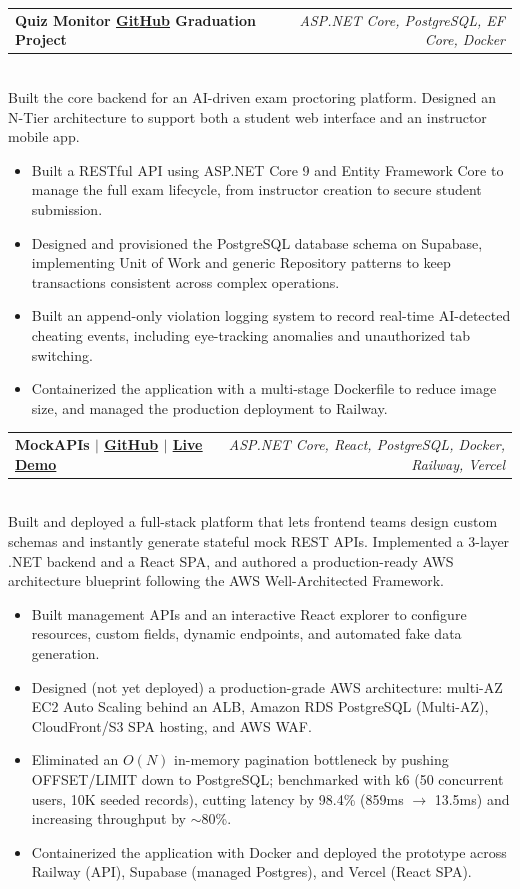 \documentclass[letterpaper,11pt]{article}
\makeatletter
\newcommand{\resumeItem}[1]{
\item\small{
    {#1 \vspace{-2pt}}
  }
}
\newcommand{\resumeProjectHeading}[2]{
\item
\begin{tabular*}{0.97\textwidth}{l@{\extracolsep{\fill}}r}
\small\textbf{#1} & \textit{\small #2} \\
\end{tabular*}\vspace{-7pt}
}
\newcommand{\resumeItemListStart}{\begin{itemize}}
\newcommand{\resumeItemListEnd}{\end{itemize}\vspace{-5pt}}
\makeatother
\begin{document}
\resumeProjectHeading
    {\textbf{Quiz Monitor} \textbar{} \href{https://github.com/Quiz-Monitor/Backend}{\underline{GitHub}} \textbar{} \textbf{Graduation Project}}
    {ASP.NET Core, PostgreSQL, EF Core, Docker}
\mbox{}\\

  Built the core backend for an AI-driven exam proctoring platform. Designed an N-Tier architecture to support both a student web interface and an instructor mobile app.

\resumeItemListStart
\resumeItem{Built a RESTful API using ASP.NET Core 9 and Entity Framework Core to manage the full exam lifecycle, from instructor creation to secure student submission.}
\resumeItem{Designed and provisioned the PostgreSQL database schema on Supabase, implementing Unit of Work and generic Repository patterns to keep transactions consistent across complex operations.}
\resumeItem{Built an append-only violation logging system to record real-time AI-detected cheating events, including eye-tracking anomalies and unauthorized tab switching.}
\resumeItem{Containerized the application with a multi-stage Dockerfile to reduce image size, and managed the production deployment to Railway.}
\resumeItemListEnd

\resumeProjectHeading
    {\textbf{MockAPIs} $|$ \href{https://github.com/0xmahmoudd/MockAPIs}{\underline{GitHub}} $|$ \href{https://mock-apis-nine.vercel.app/}{\underline{Live Demo}}}{ASP.NET Core, React, PostgreSQL, Docker, Railway, Vercel}
\mbox{}\\

  Built and deployed a full-stack platform that lets frontend teams design custom schemas and instantly generate stateful mock REST APIs. Implemented a 3-layer .NET backend and a React SPA, and authored a production-ready AWS architecture blueprint following the AWS Well-Architected Framework.
\resumeItemListStart
\resumeItem{Built management APIs and an interactive React explorer to configure resources, custom fields, dynamic endpoints, and automated fake data generation.}
\resumeItem{Designed (not yet deployed) a production-grade AWS architecture: multi-AZ EC2 Auto Scaling behind an ALB, Amazon RDS PostgreSQL (Multi-AZ), CloudFront/S3 SPA hosting, and AWS WAF.}
\resumeItem{Eliminated an $O(N)$ in-memory pagination bottleneck by pushing OFFSET/LIMIT down to PostgreSQL; benchmarked with k6 (50 concurrent users, 10K seeded records), cutting latency by 98.4\% (859ms $\rightarrow$ 13.5ms) and increasing throughput by $\sim$80\%.}
\resumeItem{Containerized the application with Docker and deployed the prototype across Railway (API), Supabase (managed Postgres), and Vercel (React SPA).}
\resumeItemListEnd
\end{document}
